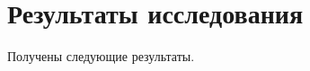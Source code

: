 \newpage
\section{Результаты исследования}\label{section:Результаты}

Получены следующие результаты.

